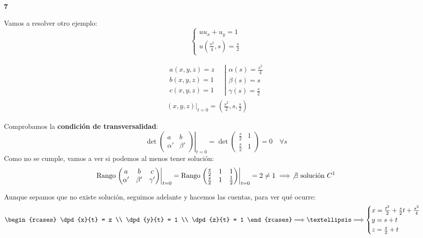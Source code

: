 	\begin{example}{\bf 7}

		Vamos a resolver otro ejemplo:
		\[
		\begin{cases}
			uu_x+ u_y = 1\\
			u(\frac{s^2}{4}, s) = \frac{s}{2}
		\end{cases}
		\]

		\begin{gather*}
			\left. \begin{array}{r}
			a(x,y,z) = z \quad\\
			b(x,y,z) = 1 \quad\\
			c(x,y,z) = 1 \quad
			\end{array} \right| \begin{array}{l}
			\alpha(s) = \frac{s^2}{4} \\
			\beta(s) = s \\
			\gamma(s) = \frac{s}{2} \end{array}\\
			(x,y,z)|_{t=0} = (\frac{s^2}{2}, s, \frac{s}{2})
		\end{gather*}


		Comprobamos la {\bf condición de transversalidad}:
		\[\det \left. \begin{pmatrix}
			a & b \\
			\alpha' & \beta'
		\end{pmatrix}\right|_{t=0} =
		\det \begin{pmatrix}
			\frac{s}{2} & 1 \\
			\frac{s}{2} & 1
		\end{pmatrix} = 0 \quad \forall s \]
		Como no se cumple, vamos a ver si podemos al menos tener solución:
		\[ \text{Rango}
		\left. \begin{pmatrix}
			a & b & c \\
			\alpha' & \beta' & \gamma'
		\end{pmatrix}
		\right|_{t=0} = \text{Rango}
		\left. \begin{pmatrix}
			\frac{s}{2} &1 & 1 \\
			\frac{s}{2} &1 & \frac{1}{2}
		\end{pmatrix} \right|_{t=0} = 2 \neq 1 \implies \not \exists \text{ solución } C^1
		\]

		Aunque sepamos que no existe solución, seguimos adelante y hacemos las cuentas, para ver qué ocurre:
		\[
		\begin{rcases}
			 \dpd{x}{t} = z  \\
			 \dpd{y}{t} = 1 \\
			 \dpd{z}{t} = 1
		\end{rcases}
		\Longrightarrow … \Longrightarrow
		\begin{cases}
			x = \frac{t^2}{2}+\frac{s}{2}t + \frac{s^2}{4} \\
			y = s+t \\
			z = \frac{s}{2}+t
		\end{cases}
		\]


\end{example}
